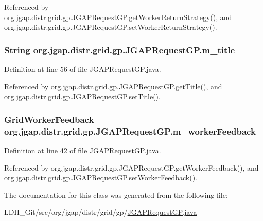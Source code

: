 Referenced by org.\-jgap.\-distr.\-grid.\-gp.\-J\-G\-A\-P\-Request\-G\-P.\-get\-Worker\-Return\-Strategy(), and org.\-jgap.\-distr.\-grid.\-gp.\-J\-G\-A\-P\-Request\-G\-P.\-set\-Worker\-Return\-Strategy().

\hypertarget{classorg_1_1jgap_1_1distr_1_1grid_1_1gp_1_1_j_g_a_p_request_g_p_ac44bc0ed6131af88f42c7c35903c87ae}{
\subsubsection[{m\-\_\-title}]{\setlength{\rightskip}{0pt plus 5cm}String org.\-jgap.\-distr.\-grid.\-gp.\-J\-G\-A\-P\-Request\-G\-P.\-m\-\_\-title\hspace{0.3cm}{\ttfamily [private]}}}\label{classorg_1_1jgap_1_1distr_1_1grid_1_1gp_1_1_j_g_a_p_request_g_p_ac44bc0ed6131af88f42c7c35903c87ae}


Definition at line 56 of file J\-G\-A\-P\-Request\-G\-P.\-java.



Referenced by org.\-jgap.\-distr.\-grid.\-gp.\-J\-G\-A\-P\-Request\-G\-P.\-get\-Title(), and org.\-jgap.\-distr.\-grid.\-gp.\-J\-G\-A\-P\-Request\-G\-P.\-set\-Title().

\hypertarget{classorg_1_1jgap_1_1distr_1_1grid_1_1gp_1_1_j_g_a_p_request_g_p_a21597f0b0cea30f196246948fc8d3c93}{
\subsubsection[{m\-\_\-worker\-Feedback}]{\setlength{\rightskip}{0pt plus 5cm}Grid\-Worker\-Feedback org.\-jgap.\-distr.\-grid.\-gp.\-J\-G\-A\-P\-Request\-G\-P.\-m\-\_\-worker\-Feedback\hspace{0.3cm}{\ttfamily [private]}}}\label{classorg_1_1jgap_1_1distr_1_1grid_1_1gp_1_1_j_g_a_p_request_g_p_a21597f0b0cea30f196246948fc8d3c93}


Definition at line 42 of file J\-G\-A\-P\-Request\-G\-P.\-java.



Referenced by org.\-jgap.\-distr.\-grid.\-gp.\-J\-G\-A\-P\-Request\-G\-P.\-get\-Worker\-Feedback(), and org.\-jgap.\-distr.\-grid.\-gp.\-J\-G\-A\-P\-Request\-G\-P.\-set\-Worker\-Feedback().



The documentation for this class was generated from the following file\-:\begin{DoxyCompactItemize}
\item 
L\-D\-H\-\_\-\-Git/src/org/jgap/distr/grid/gp/\hyperlink{_j_g_a_p_request_g_p_8java}{J\-G\-A\-P\-Request\-G\-P.\-java}\end{DoxyCompactItemize}
